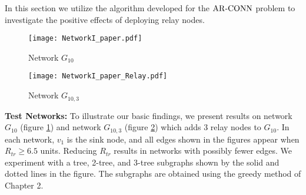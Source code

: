 In this section we utilize the algorithm developed for the ${\mathrm {AR\mbox{-}CONN}}$ problem to investigate the positive effects of deploying relay nodes.
\begin{figure}[!htb]
\begin{minipage}{.9\linewidth}
\texttt{[image: NetworkI\_paper.pdf]}
\caption{Network $G_{10}$}
\label{fig:netI1}
\end{minipage}
\end{figure}

\begin{figure}[!htb]
\begin{minipage}{.9\linewidth}
\texttt{[image: NetworkI\_paper\_Relay.pdf]}
\caption{Network $G_{10,3}$}
\label{fig:netIR}
\end{minipage}
\end{figure}

\textbf{Test Networks:} To illustrate our basic findings, we present results on network $G_{10}$ (figure \ref{fig:netI1}) and network $G_{10,3}$ (figure \ref{fig:netIR}) which adds 3 relay nodes to $G_{10}$. In each network, $v_1$ is the sink node, and all edges shown in the figures appear when $R_{tr}\geq 6.5$ units. Reducing $R_{tr}$ results in networks with possibly fewer edges. We experiment with a tree, 2-tree, and 3-tree subgraphs shown by the solid and dotted lines in the figure. The subgraphs are obtained using the greedy method of Chapter 2.

